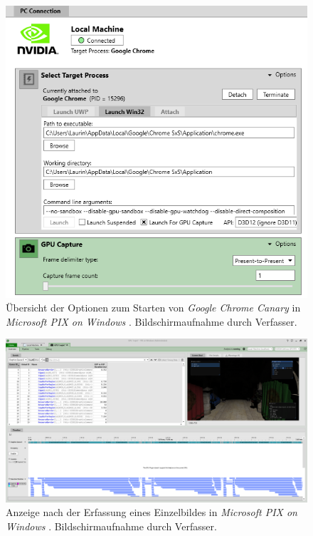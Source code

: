 \documentclass[oneside]{ausarbeitung}
\begin{document}
\begin{figure}
    \includegraphics[width=\textwidth]{images/pix_options.png}
    \caption{Übersicht der Optionen zum Starten von \textit{Google Chrome Canary} in \textit{Microsoft PIX on Windows} \cite{microsoft:pix}. Bildschirmaufnahme durch Verfasser.}
    \label{fig:pix_options}
\end{figure}

\begin{figure}
    \includegraphics[width=\textwidth]{images/pix_overview.png}
    \caption{Anzeige nach der Erfassung eines Einzelbildes in \textit{Microsoft PIX on Windows} \cite{microsoft:pix}. Bildschirmaufnahme durch Verfasser.}
    \label{fig:pix_overview}
\end{figure}
\end{document}
